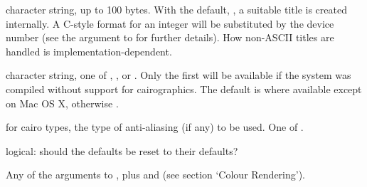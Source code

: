 \begin{Arguments}
\begin{ldescription}
\item[\code{title}] character string, up to 100 bytes.  With the default,
, a suitable title is created internally.  A C-style format
for an integer will be substituted by the device number (see the
 argument to  for further
details).  How non-ASCII titles are handled is
implementation-dependent.

\item[\code{type}] character string, one of , ,
 or .  Only the first will be
available if the system was compiled without support for
cairographics.  The default is  where available except
on Mac OS X, otherwise .

\item[\code{antialias}] for cairo types, the type of anti-aliasing (if any)
to be used.  One of .

\item[\code{reset}] logical: should the defaults be reset to their defaults?

\item[\code{...}] Any of the arguments to , plus 
and  (see section `Colour Rendering').
\end{ldescription}
\end{Arguments}
%
